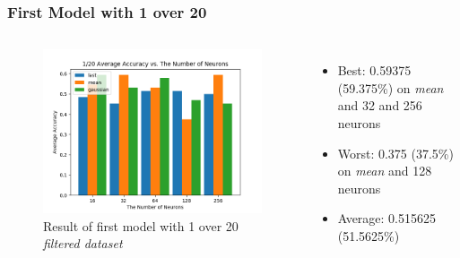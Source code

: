 \documentclass{beamer}
\begin{document}
\begin{frame}
\frametitle{First Model with 1 over 20}
\begin{columns}
\begin{figure}[t!]
    \centering
    \includegraphics[width=\textwidth]{../paper/pictures/result_pictures/filtered_1_20_result.png}
    \caption{Result of first model with 1 over 20 {\em filtered dataset}}
    \label{fig:filter_1_20}
\end{figure}

\begin{itemize}
\item Best: 0.59375 (59.375\%) on {\em mean} and 32 and 256 neurons
\item Worst: 0.375 (37.5\%) on {\em mean} and 128 neurons
\item Average: 0.515625 (51.5625\%)
\end{itemize}
\end{columns}
\end{frame}
\end{document}
